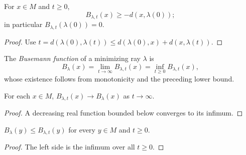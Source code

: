 \begin{lemma}
\label{lem:busemann-approx-lower-bound}



For $x\in M$ and $t\ge0$,
$$B_{\lambda,t}(x)\ge-d(x,\lambda(0));$$
in particular $B_{\lambda,t}(\lambda(0))=0$.
\end{lemma}
\begin{proof}
\sketch
\leanok
Use $t=d(\lambda(0),\lambda(t))\le d(\lambda(0),x)+d(x,\lambda(t))$.
\end{proof}

\begin{definition}
\label{def:busemann-function}




The \emph{Busemann function} of a minimizing ray $\lambda$ is
$$B_\lambda(x)=\lim_{t\to\infty}B_{\lambda,t}(x)
=\inf_{t\ge0}B_{\lambda,t}(x),$$
whose existence follows from monotonicity and the preceding lower bound.
\end{definition}

\begin{lemma}
\label{lem:busemann-limit}
\leanok



For each $x\in M$, $B_{\lambda,t}(x)\to B_\lambda(x)$ as
$t\to\infty$.
\end{lemma}
\begin{proof}
\sketch
\leanok
{}
A decreasing real function bounded below converges to its infimum.
\end{proof}

\begin{lemma}
\label{lem:busemann-le-approx}
\leanok



$B_\lambda(y)\le B_{\lambda,t}(y)$ for every $y\in M$ and $t\ge0$.
\end{lemma}
\begin{proof}
\sketch
\leanok
The left side is the infimum over all $t\ge0$.
\end{proof}

